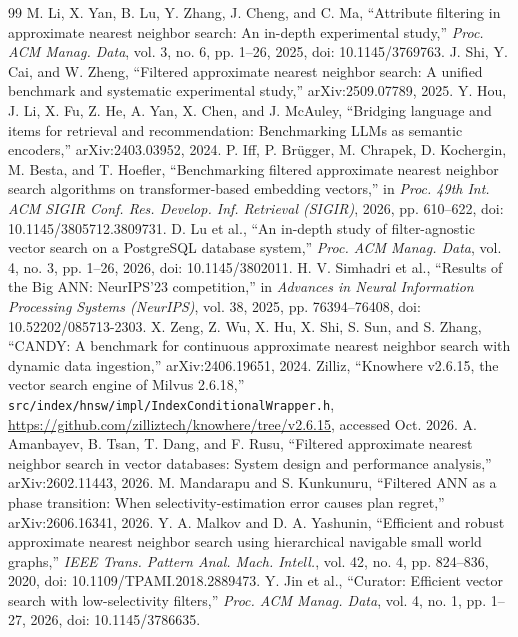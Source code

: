 \documentclass[conference]{IEEEtran}
\begin{document}
\begin{thebibliography}{99}
 M. Li, X. Yan, B. Lu, Y. Zhang, J. Cheng, and C. Ma, ``Attribute filtering in approximate nearest neighbor search: An in-depth experimental study,'' \emph{Proc. ACM Manag. Data}, vol. 3, no. 6, pp. 1--26, 2025, doi: 10.1145/3769763.
 J. Shi, Y. Cai, and W. Zheng, ``Filtered approximate nearest neighbor search: A unified benchmark and systematic experimental study,'' arXiv:2509.07789, 2025.
 Y. Hou, J. Li, X. Fu, Z. He, A. Yan, X. Chen, and J. McAuley, ``Bridging language and items for retrieval and recommendation: Benchmarking LLMs as semantic encoders,'' arXiv:2403.03952, 2024.
 P. Iff, P. Br\"ugger, M. Chrapek, D. Kochergin, M. Besta, and T. Hoefler, ``Benchmarking filtered approximate nearest neighbor search algorithms on transformer-based embedding vectors,'' in \emph{Proc. 49th Int. ACM SIGIR Conf. Res. Develop. Inf. Retrieval (SIGIR)}, 2026, pp. 610--622, doi: 10.1145/3805712.3809731.
 D. Lu et al., ``An in-depth study of filter-agnostic vector search on a PostgreSQL database system,'' \emph{Proc. ACM Manag. Data}, vol. 4, no. 3, pp. 1--26, 2026, doi: 10.1145/3802011.
 H. V. Simhadri et al., ``Results of the Big ANN: NeurIPS'23 competition,'' in \emph{Advances in Neural Information Processing Systems (NeurIPS)}, vol. 38, 2025, pp. 76394--76408, doi: 10.52202/085713-2303.
 X. Zeng, Z. Wu, X. Hu, X. Shi, S. Sun, and S. Zhang, ``CANDY: A benchmark for continuous approximate nearest neighbor search with dynamic data ingestion,'' arXiv:2406.19651, 2024.
 Zilliz, ``Knowhere v2.6.15, the vector search engine of Milvus 2.6.18,'' \texttt{src/index/hnsw/impl/IndexConditionalWrapper.h}, \url{https://github.com/zilliztech/knowhere/tree/v2.6.15}, accessed Oct. 2026.
 A. Amanbayev, B. Tsan, T. Dang, and F. Rusu, ``Filtered approximate nearest neighbor search in vector databases: System design and performance analysis,'' arXiv:2602.11443, 2026.
 M. Mandarapu and S. Kunkunuru, ``Filtered ANN as a phase transition: When selectivity-estimation error causes plan regret,'' arXiv:2606.16341, 2026.
 Y. A. Malkov and D. A. Yashunin, ``Efficient and robust approximate nearest neighbor search using hierarchical navigable small world graphs,'' \emph{IEEE Trans. Pattern Anal. Mach. Intell.}, vol. 42, no. 4, pp. 824--836, 2020, doi: 10.1109/TPAMI.2018.2889473.
 Y. Jin et al., ``Curator: Efficient vector search with low-selectivity filters,'' \emph{Proc. ACM Manag. Data}, vol. 4, no. 1, pp. 1--27, 2026, doi: 10.1145/3786635.

\end{thebibliography}
\end{document}
